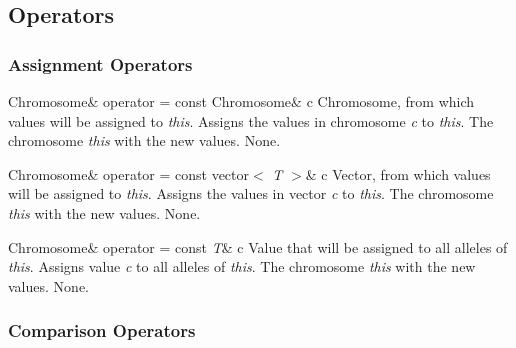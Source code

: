 \subsection{Operators}

\subsubsection{Assignment Operators}

    \printMethodWithOneParam
        {Chromosome\&}
        {operator = } 
        {const Chromosome\&}
        {c} 
        {Chromosome, from which values will be assigned to {\em this}.}
        {Assigns the values in chromosome {\em c} to {\em this}.}
        {The chromosome {\em this} with the new values.}
        {None.}

\vspace*{4ex}

    \printMethodWithOneParam
        {Chromosome\&}  
        {operator = } 
        {const vector$<$ {\sl T} $>$\&}
        {c} 
        {Vector, from which values will be assigned to {\em this}.}
        {Assigns the values in vector {\em c} to {\em this}.}
        {The chromosome {\em this} with the new values.}
        {None.}

\vspace*{4ex}

    \printMethodWithOneParam
        {Chromosome\&}  
        {operator = } 
        {const {\sl T}\&}
        {c} 
        {Value that will be assigned to all alleles of {\em this}.}
        {Assigns value {\em c} to all alleles of {\em this}.}
        {The chromosome {\em this} with the new values.}
        {None.}

\clearpage

\subsubsection{Comparison Operators}

